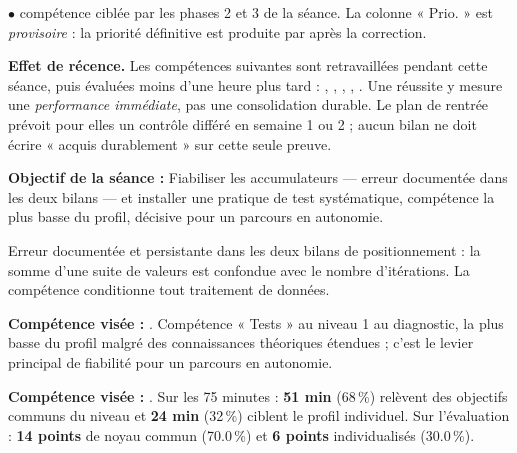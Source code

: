 \documentclass[10pt,a4paper]{article}
\begin{document}
\par\small$\bullet$ compétence ciblée par les phases 2 et 3 de la séance. La colonne « Prio. » est \emph{provisoire} : la priorité définitive est produite par  après la correction.
\begin{warningbox}\textbf{Effet de récence.} Les compétences suivantes sont retravaillées pendant cette séance, puis évaluées moins d'une heure plus tard : , , , , . Une réussite y mesure une \emph{performance immédiate}, pas une consolidation durable. Le plan de rentrée prévoit pour elles un contrôle différé en semaine 1 ou 2 ; aucun bilan ne doit écrire « acquis durablement » sur cette seule preuve.\end{warningbox}
\begin{goalbox}\textbf{Objectif de la séance :} Fiabiliser les accumulateurs — erreur documentée dans les deux bilans — et installer une pratique de test systématique, compétence la plus basse du profil, décisive pour un parcours en autonomie.\end{goalbox}
Erreur documentée et persistante dans les deux bilans de positionnement : la somme d'une suite de valeurs est confondue avec le nombre d'itérations. La compétence conditionne tout traitement de données.
\par\vspace{1mm}\textbf{Compétence visée :} .
Compétence « Tests » au niveau 1 au diagnostic, la plus basse du profil malgré des connaissances théoriques étendues ; c'est le levier principal de fiabilité pour un parcours en autonomie.
\par\vspace{1mm}\textbf{Compétence visée :} .
Sur les 75 minutes : \textbf{51 min} (68\,\%) relèvent des objectifs communs du niveau et \textbf{24 min} (32\,\%) ciblent le profil individuel. Sur l'évaluation : \textbf{14 points} de noyau commun (70.0\,\%) et \textbf{6 points} individualisés (30.0\,\%).
\newpage{}
\end{document}
